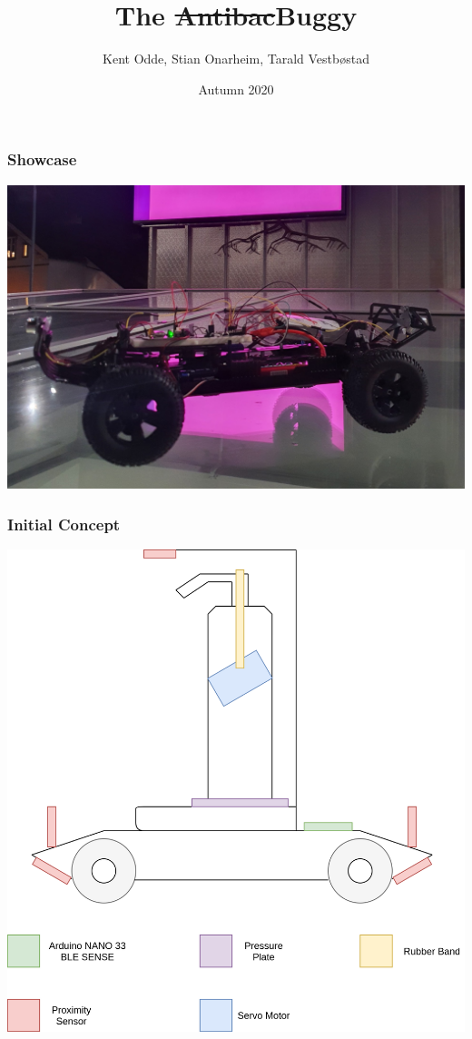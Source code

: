 \documentclass{beamer}
\title{The \sout{Antibac}Buggy}
\author{Kent Odde, Stian Onarheim, Tarald Vestbøstad}
\institute{USN}
\date{Autumn 2020}
\begin{document}
\frame{\titlepage}

    \begin{frame}
        \frametitle{Showcase}
        \includegraphics[width=\linewidth]{img/showcase.png}
    \end{frame}

    \begin{frame}
        \centering
        \frametitle{Initial Concept}
        \includegraphics[scale=0.2, keepaspectratio]{img/prototype-drawing.png}
    \end{frame}
\end{document}
